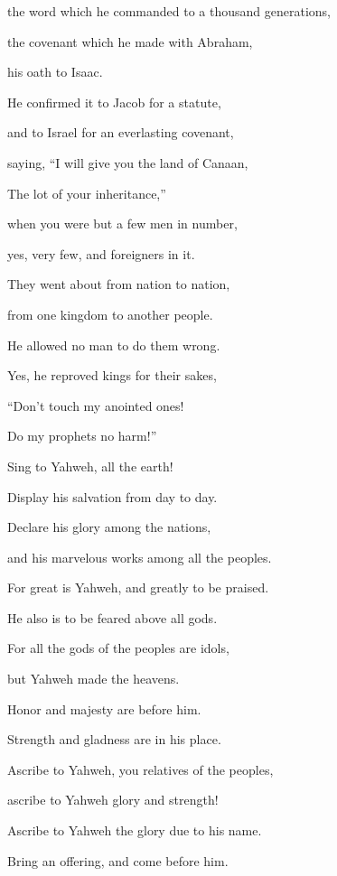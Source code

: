 {\par }{\QB the word which he commanded to a thousand generations,
\par }{\QB {}the covenant which he made with Abraham,
\par }{\QB his oath to Isaac.
\par }{\Q {}He confirmed it to Jacob for a statute,
\par }{\QB and to Israel for an everlasting covenant,
\par }{\Q {}saying, “I will give you the land of Canaan,
\par }{\QB The lot of your inheritance,”
\par }{\QB {}when you were but a few men in number,
\par }{\QB yes, very few, and foreigners in it.
\par }{\Q {}They went about from nation to nation,
\par }{\QB from one kingdom to another people.
\par }{\Q {}He allowed no man to do them wrong.
\par }{\QB Yes, he reproved kings for their sakes,
\par }{\Q {}“Don’t touch my anointed ones!
\par }{\QB Do my prophets no harm!”
\par }{\Q {}Sing to Yahweh, all the earth!
\par }{\QB Display his salvation from day to day.
\par }{\Q {}Declare his glory among the nations,
\par }{\QB and his marvelous works among all the peoples.
\par }{\Q {}For great is Yahweh, and greatly to be praised.
\par }{\QB He also is to be feared above all gods.
\par }{\Q {}For all the gods of the peoples are idols,
\par }{\QB but Yahweh made the heavens.
\par }{\Q {}Honor and majesty are before him.
\par }{\QB Strength and gladness are in his place.
\par }{\Q {}Ascribe to Yahweh, you relatives of the peoples,
\par }{\QB ascribe to Yahweh glory and strength!
\par }{\Q {}Ascribe to Yahweh the glory due to his name.
\par }{\QB Bring an offering, and come before him.
}
